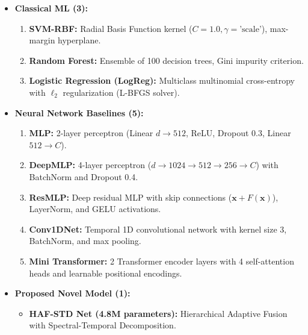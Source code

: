 \documentclass[a4paper, 11pt]{article}
\begin{document}
\begin{techbox}
\begin{itemize}
    \item \textbf{Classical ML (3):}
    \begin{enumerate}
        \item \textbf{SVM-RBF:} Radial Basis Function kernel ($C=1.0, \gamma=\text{'scale'}$), max-margin hyperplane.
        \item \textbf{Random Forest:} Ensemble of 100 decision trees, Gini impurity criterion.
        \item \textbf{Logistic Regression (LogReg):} Multiclass multinomial cross-entropy with $\ell_2$ regularization (L-BFGS solver).
    \end{enumerate}
    \item \textbf{Neural Network Baselines (5):}
    \begin{enumerate}
        \item \textbf{MLP:} 2-layer perceptron (Linear $d \rightarrow 512$, ReLU, Dropout 0.3, Linear $512 \rightarrow C$).
        \item \textbf{DeepMLP:} 4-layer perceptron ($d \rightarrow 1024 \rightarrow 512 \rightarrow 256 \rightarrow C$) with BatchNorm and Dropout 0.4.
        \item \textbf{ResMLP:} Deep residual MLP with skip connections ($\mathbf{x} + F(\mathbf{x})$), LayerNorm, and GELU activations.
        \item \textbf{Conv1DNet:} Temporal 1D convolutional network with kernel size 3, BatchNorm, and max pooling.
        \item \textbf{Mini Transformer:} 2 Transformer encoder layers with 4 self-attention heads and learnable positional encodings.
    \end{enumerate}
    \item \textbf{Proposed Novel Model (1):}
    \begin{itemize}
        \item \textbf{HAF-STD Net (4.8M parameters):} Hierarchical Adaptive Fusion with Spectral-Temporal Decomposition.
    \end{itemize}
\end{itemize}
\end{techbox}
\end{document}

